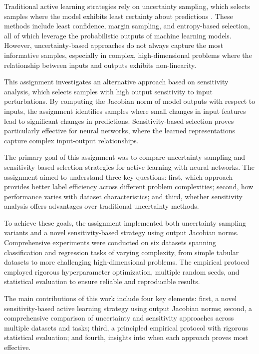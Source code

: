 \documentclass[conference]{IEEEtran}
\begin{document}
Traditional active learning strategies rely on uncertainty sampling, which selects samples where the model exhibits least certainty about predictions \cite{settles2009active}. These methods include least confidence, margin sampling, and entropy-based selection, all of which leverage the probabilistic outputs of machine learning models. However, uncertainty-based approaches do not always capture the most informative samples, especially in complex, high-dimensional problems where the relationship between inputs and outputs exhibits non-linearity.

This assignment investigates an alternative approach based on sensitivity analysis, which selects samples with high output sensitivity to input perturbations. By computing the Jacobian norm of model outputs with respect to inputs, the assignment identifies samples where small changes in input features lead to significant changes in predictions. Sensitivity-based selection proves particularly effective for neural networks, where the learned representations capture complex input-output relationships.

The primary goal of this assignment was to compare uncertainty sampling and sensitivity-based selection strategies for active learning with neural networks. The assignment aimed to understand three key questions: first, which approach provides better label efficiency across different problem complexities; second, how performance varies with dataset characteristics; and third, whether sensitivity analysis offers advantages over traditional uncertainty methods.

To achieve these goals, the assignment implemented both uncertainty sampling variants and a novel sensitivity-based strategy using output Jacobian norms. Comprehensive experiments were conducted on six datasets spanning classification and regression tasks of varying complexity, from simple tabular datasets to more challenging high-dimensional problems. The empirical protocol employed rigorous hyperparameter optimization, multiple random seeds, and statistical evaluation to ensure reliable and reproducible results.

The main contributions of this work include four key elements: first, a novel sensitivity-based active learning strategy using output Jacobian norms; second, a comprehensive comparison of uncertainty and sensitivity approaches across multiple datasets and tasks; third, a principled empirical protocol with rigorous statistical evaluation; and fourth, insights into when each approach proves most effective.
\end{document}
